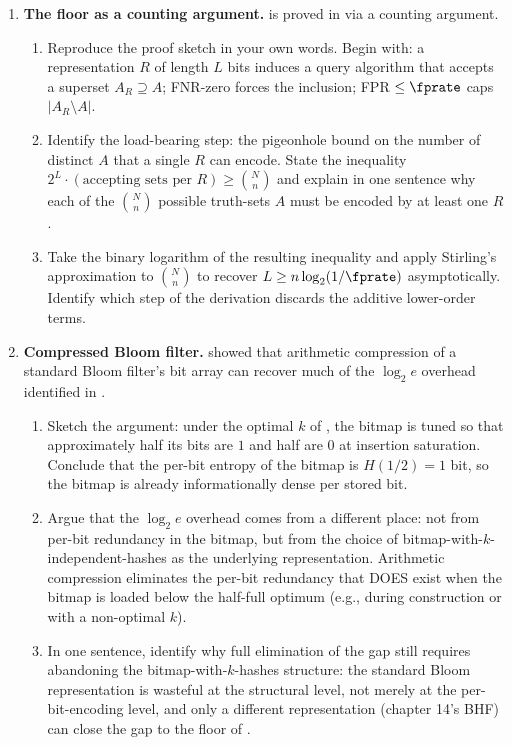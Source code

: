 \begin{enumerate}

\item \exstarstarstar
\label{ex:ch8-9}
\textbf{The floor as a counting argument.}
 is proved in  via
a counting argument.
\begin{enumerate}
  \item[(a)] Reproduce the proof sketch in your own words. Begin
    with: a representation $R$ of length $L$ bits induces a query
    algorithm that accepts a superset $A_R \supseteq A$; FNR-zero
    forces the inclusion; FPR $\le \fprate$ caps $|A_R \setminus
    A|$.
  \item[(b)] Identify the load-bearing step: the pigeonhole bound
    on the number of distinct $A$ that a single $R$ can encode.
    State the inequality $2^L \cdot (\text{accepting sets per
    } R) \ge \binom{N}{n}$ and explain in one sentence why each
    of the $\binom{N}{n}$ possible truth-sets $A$ must be encoded
    by at least one $R$.
  \item[(c)] Take the binary logarithm of the resulting inequality
    and apply Stirling's approximation to $\binom{N}{n}$ to
    recover $L \ge n \log_2(1/\fprate)$ asymptotically. Identify
    which step of the derivation discards the additive
    lower-order terms.
\end{enumerate}

\item \exstarstarstar
\label{ex:ch8-10}
\textbf{Compressed Bloom filter.}
\cite{mitzenmacher-2002} showed that arithmetic compression of a
standard Bloom filter's bit array can recover much of the $\log_2
e$ overhead identified in .
\begin{enumerate}
  \item[(a)] Sketch the argument: under the optimal $k$ of
    , the bitmap is tuned so that
    approximately half its bits are $1$ and half are $0$ at
    insertion saturation. Conclude that the per-bit entropy of
    the bitmap is $H(1/2) = 1$ bit, so the bitmap is already
    informationally dense per stored bit.
  \item[(b)] Argue that the $\log_2 e$ overhead comes from a
    different place: not from per-bit redundancy in the bitmap,
    but from the choice of bitmap-with-$k$-independent-hashes as
    the underlying representation. Arithmetic compression
    eliminates the per-bit redundancy that DOES exist when the
    bitmap is loaded below the half-full optimum (e.g., during
    construction or with a non-optimal $k$).
  \item[(c)] In one sentence, identify why full elimination of
    the gap still requires abandoning the bitmap-with-$k$-hashes
    structure: the standard Bloom representation is wasteful at
    the structural level, not merely at the per-bit-encoding
    level, and only a different representation (chapter 14's BHF)
    can close the gap to the floor of .
\end{enumerate}


\end{enumerate}
